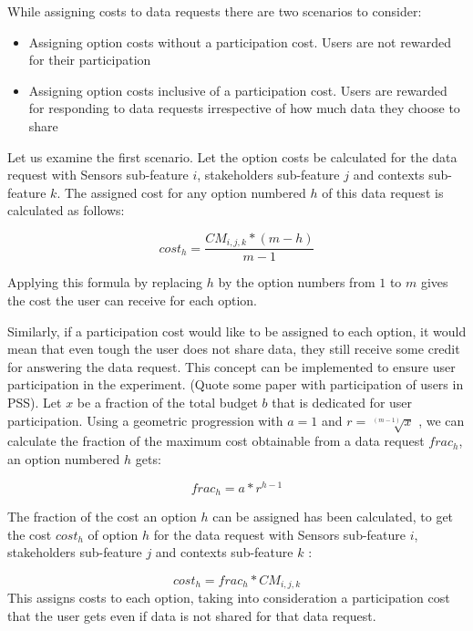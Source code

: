 While assigning costs to data requests there are two scenarios to consider:

\begin{itemize}
\item Assigning option costs without a participation cost. Users are not rewarded for their participation
\item Assigning option costs inclusive of a participation cost. Users are rewarded for responding to data requests irrespective of how much data they choose to share
\end{itemize}

Let us examine the first scenario. Let the option costs be calculated for the data request with Sensors sub-feature $i$, stakeholders sub-feature $j$ and
contexts sub-feature $k$. The assigned cost for any option numbered $h$ of this data request is calculated as follows:

\begin{equation}
cost_{h} =  \frac{CM_{i,j,k}*(m-h)}{m-1}
\end{equation}

Applying this formula by replacing $h$ by the option numbers from $1$ to $m$ gives the cost the user can receive for each option.


Similarly, if a participation cost would like to be assigned to each option, it would mean that even tough the user does not share data, they still
receive some credit for answering the data request. This concept can be implemented to ensure user participation in the experiment. (Quote some paper with
participation of users in PSS). Let $x$ be a fraction of the total budget $b$ that is dedicated for user participation. Using a geometric progression with $a=1$ and $r=\sqrt[(m-1)]{x}$ , we can calculate the fraction of the maximum cost obtainable from a data request $frac_{h}$, an option numbered $h$ gets:

\begin{equation}
frac_{h} = a * r^{h-1}
\end{equation}

The fraction of the cost an option $h$ can be assigned has been calculated, to get the cost $cost_{h}$ of option $h$ for the data request with Sensors sub-feature $i$, stakeholders sub-feature $j$ and
contexts sub-feature $k$ :

\begin{equation}
cost_{h} = frac_{h} * CM_{i,j,k}
\end{equation}
This assigns costs to each option, taking into consideration a participation cost that the user gets even if data is not shared for that data request.

